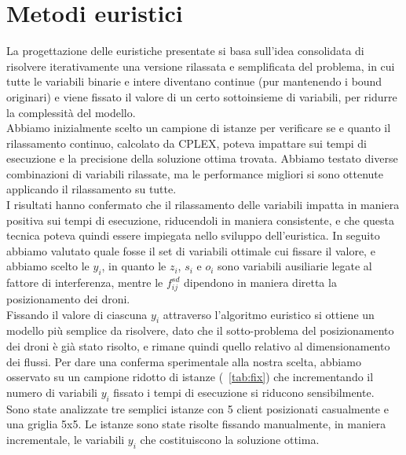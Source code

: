\section{Metodi euristici} \label{sec:euristica}
La progettazione delle euristiche presentate si basa sull'idea consolidata di risolvere iterativamente una versione rilassata e semplificata del problema, in cui tutte le variabili binarie e intere diventano continue (pur mantenendo i bound originari) e viene fissato il valore di un certo sottoinsieme di variabili, per ridurre la complessità del modello. \\
Abbiamo inizialmente scelto un campione di istanze per verificare se e quanto il rilassamento continuo, calcolato da CPLEX, poteva impattare sui tempi di esecuzione e la precisione della soluzione ottima trovata. 
Abbiamo testato diverse combinazioni di variabili rilassate, ma le performance migliori si sono ottenute applicando il rilassamento su tutte. \\
I risultati hanno confermato che il rilassamento delle variabili impatta in maniera positiva sui tempi di esecuzione, riducendoli in maniera consistente, e che questa tecnica poteva quindi essere impiegata nello sviluppo dell'euristica.
In seguito abbiamo valutato quale fosse il set di variabili ottimale cui fissare il valore, e abbiamo scelto le $y_i$, in quanto le $z_i$, $s_i$ e $o_i$ sono variabili ausiliarie legate al fattore di interferenza, mentre le $f_{ij}^{sd}$ dipendono in maniera diretta la posizionamento dei droni. \\
Fissando il valore di ciascuna $y_i$ attraverso l'algoritmo euristico si ottiene un modello più semplice da risolvere, dato che il sotto-problema del posizionamento dei droni è già stato risolto, e rimane quindi quello relativo al dimensionamento dei flussi. 
Per dare una conferma sperimentale alla nostra scelta, abbiamo osservato su un campione ridotto di istanze (\tablename\ \ref{tab:fix}) che incrementando il numero di variabili $y_i$ fissato i tempi di esecuzione si riducono sensibilmente. \\
Sono state analizzate tre semplici istanze con 5 client posizionati casualmente e una griglia 5x5. Le istanze sono state risolte fissando manualmente, in maniera incrementale, le variabili $y_i$ che costituiscono la soluzione ottima.
